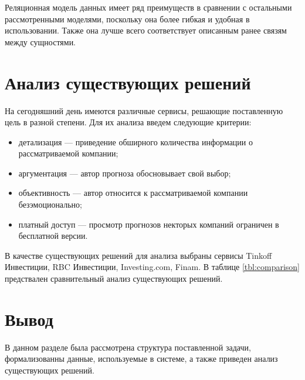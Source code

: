 Реляционная модель данных имеет ряд преимуществ в сравнении с остальными рассмотренными моделями, поскольку она более гибкая и удобная в использовании. Также она лучше всего соответствует описанным ранее связям между сущностями.



\section{Анализ существующих решений}
На сегодняшний день имеются различные сервисы, решающие поставленную цель в разной степени. Для их анализа введем следующие критерии: 
\begin{itemize}
	\item детализация --- приведение обширного количества информации о рассматриваемой компании;
 	\item аргументация --- автор прогноза обосновывает свой выбор;
  	\item объективность --- автор относится к рассматриваемой компании безэмоционально;
   	\item платный доступ --- просмотр прогнозов некторых компаний ограничен в бесплатной версии.
\end{itemize}
В качестве существующих решений для анализа выбраны сервисы Tinkoff Инвестиции, RBC Инвестиции, Investing.com, Finam.
В таблице \ref*{tbl:comparison} предствален сравнительный анализ существующих решений.

\begin{table}[H]
	\centering
	\caption{Анализ существующих решений}
	\label{tbl:comparison}
\end{table}


\section*{Вывод}

В данном разделе была рассмотрена структура поставленной задачи, формализованны данные, используемые в системе, а также приведен анализ существующих решений.
